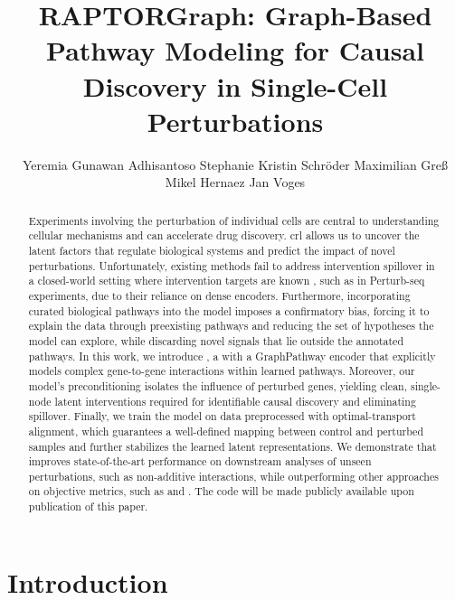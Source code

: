 \documentclass{article}
\title{RAPTORGraph: Graph-Based Pathway Modeling for Causal Discovery in Single-Cell Perturbations}
\author{Yeremia Gunawan Adhisantoso \And Stephanie Kristin Schröder \And Maximilian Greß \And Mikel Hernaez \And Jan Voges
}
\begin{document}
\maketitle

\glsresetall

\begin{abstract}

Experiments involving the perturbation of individual cells are central to understanding cellular mechanisms and can accelerate drug discovery.
\Gls{crl} allows us to uncover the latent factors that regulate biological systems and predict the impact of novel perturbations.
Unfortunately, existing methods fail to address intervention spillover in a closed-world setting where intervention targets are known \apriori, such as in Perturb-seq experiments, due to their reliance on dense encoders.
Furthermore, incorporating curated biological pathways into the model imposes a confirmatory bias, forcing it to explain the data through preexisting pathways and reducing the set of hypotheses the model can explore, while discarding novel signals that lie outside the annotated pathways.
In this work, we introduce , a \betavae{} with a GraphPathway encoder that explicitly models complex gene-to-gene interactions within learned pathways.
Moreover, our model's preconditioning isolates the influence of perturbed genes, yielding clean, single-node latent interventions required for identifiable causal discovery and eliminating spillover.
Finally, we train the model on data preprocessed with optimal-transport alignment, which guarantees a well-defined mapping between control and perturbed samples and further stabilizes the learned latent representations.
We demonstrate that  improves state-of-the-art performance on downstream analyses of unseen perturbations, such as non-additive interactions, while outperforming other approaches on objective metrics, such as  and .
The code will be made publicly available upon publication of this paper.

\end{abstract}

\glsresetall

\section{Introduction}
\label{sec:introduction}
\end{document}
